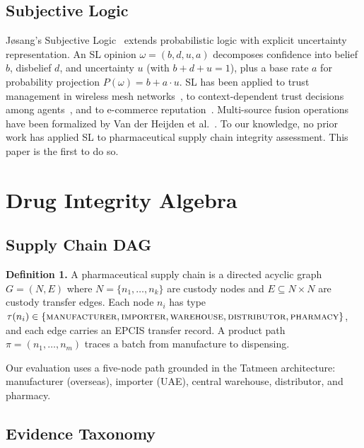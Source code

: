 \documentclass[conference]{IEEEtran}
\begin{document}
\subsection{Subjective Logic}

J\o sang's Subjective Logic~\cite{josang2016} extends probabilistic
logic with explicit uncertainty representation. An SL opinion
$\omega = (b, d, u, a)$ decomposes confidence into belief $b$,
disbelief $d$, and uncertainty $u$ (with $b + d + u = 1$), plus a base
rate $a$ for probability projection $P(\omega) = b + a \cdot u$. SL
has been applied to trust management in wireless mesh
networks~\cite{sl_manet2017}, to context-dependent trust decisions among
agents~\cite{sl_vanet2013}, and to e-commerce reputation~\cite{josang2016}. Multi-source fusion operations have been formalized by Van der Heijden et
al.~\cite{sl_multisource2018}. To our
knowledge, no prior work has applied SL to pharmaceutical supply chain
integrity assessment. This paper is the first to do so.

\section{Drug Integrity Algebra}

\subsection{Supply Chain DAG}

\textbf{Definition 1.} A pharmaceutical supply chain is a directed
acyclic graph $G = (N, E)$ where $N = \{n_1, \ldots, n_k\}$ are custody
nodes and $E \subseteq N \times N$ are custody transfer edges. Each node
$n_i$ has type $\tau(n_i) \in \{\textsc{manufacturer}, \textsc{importer},
\textsc{warehouse}, \textsc{distributor}, \textsc{pharmacy}\}$, and each
edge carries an EPCIS transfer record. A product path
$\pi = (n_1, \ldots, n_m)$ traces a batch from manufacture to
dispensing.

Our evaluation uses a five-node path grounded in the Tatmeen
architecture: manufacturer (overseas), importer (UAE), central warehouse,
distributor, and pharmacy.

\subsection{Evidence Taxonomy}
\end{document}
